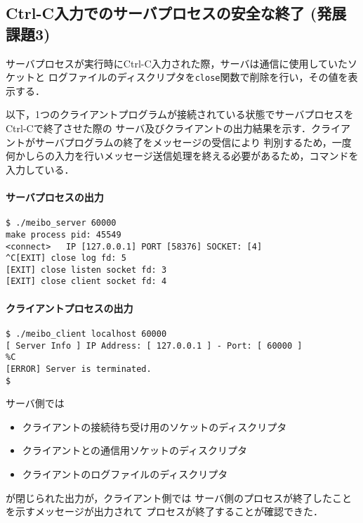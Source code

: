 \subsection{Ctrl-C入力でのサーバプロセスの安全な終了 (発展課題3)}
サーバプロセスが実行時にCtrl-C入力された際，サーバは通信に使用していたソケットと
ログファイルのディスクリプタを\verb|close|関数で削除を行い，その値を表示する．

以下，1つのクライアントプログラムが接続されている状態でサーバプロセスをCtrl-Cで終了させた際の
サーバ及びクライアントの出力結果を示す．クライアントがサーバプログラムの終了をメッセージの受信により
判別するため，一度何かしらの入力を行いメッセージ送信処理を終える必要があるため，コマンドを入力している．

\paragraph*{サーバプロセスの出力}
\begin{Verbatim}[numbers=none, numbersep=6pt, frame=single,
  fontsize=\small, baselinestretch=0.8]
$ ./meibo_server 60000
make process pid: 45549
<connect> 	IP [127.0.0.1] PORT [58376] SOCKET: [4]
^C[EXIT] close log fd: 5
[EXIT] close listen socket fd: 3
[EXIT] close client socket fd: 4
\end{Verbatim}

\paragraph*{クライアントプロセスの出力}
\begin{Verbatim}[numbers=none, numbersep=6pt, frame=single,
  fontsize=\small, baselinestretch=0.8]
$ ./meibo_client localhost 60000
[ Server Info ] IP Address: [ 127.0.0.1 ] - Port: [ 60000 ]
%C
[ERROR] Server is terminated.
$
\end{Verbatim}
サーバ側では
\begin{itemize}
  \item クライアントの接続待ち受け用のソケットのディスクリプタ
  \item クライアントとの通信用ソケットのディスクリプタ
  \item クライアントのログファイルのディスクリプタ
\end{itemize}
が閉じられた出力が，クライアント側では
サーバ側のプロセスが終了したことを示すメッセージが出力されて
プロセスが終了することが確認できた．

